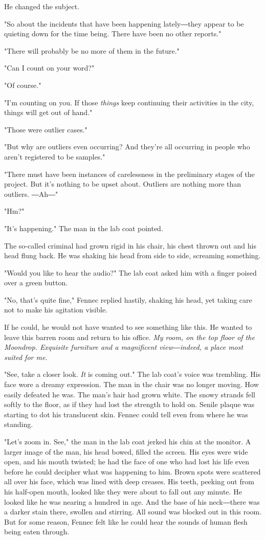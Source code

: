 He changed the subject.

"So about the incidents that have been happening lately―they appear to
be quieting down for the time being. There have been no other reports."

"There will probably be no more of them in the future."

"Can I count on your word?"

"Of course."

"I'm counting on you. If those \emph{things} keep continuing their activities
in the city, things will get out of hand."

"Those were outlier cases."

"But why are outliers even occurring? And they're all occurring in
people who aren't registered to be samples."

"There must have been instances of carelessness in the preliminary
stages of the project. But it's nothing to be upset about. Outliers are
nothing more than outliers. ―Ah―"

"Hm?"

"It's happening." The man in the lab coat pointed.

The so-called criminal had grown rigid in his chair, his chest thrown
out and his head flung back. He was shaking his head from side to side,
screaming something.

"Would you like to hear the audio?" The lab coat asked him with a finger
poised over a green button.

"No, that's quite fine," Fennec replied hastily, shaking his head, yet
taking care not to make his agitation visible.

If he could, he would not have wanted to see something like this. He
wanted to leave this barren room and return to his office. \emph{My room, on
the top floor of the Moondrop. Exquisite furniture and a magnificent
view―indeed, a place most suited for me.}

"See, take a closer look. \emph{It} is coming out." The lab coat's voice was
trembling. His face wore a dreamy expression. The man in the chair was
no longer moving. How easily defeated he was. The man's hair had grown
white. The snowy strands fell softly to the floor, as if they had lost
the strength to hold on. Senile plaque was starting to dot his
translucent skin. Fennec could tell even from where he was standing.

"Let's zoom in. See," the man in the lab coat jerked his chin at the
monitor. A larger image of the man, his head bowed, filled the screen.
His eyes were wide open, and his mouth twisted; he had the face of one
who had lost his life even before he could decipher what was happening
to him. Brown spots were scattered all over his face, which was lined
with deep creases. His teeth, peeking out from his half-open mouth,
looked like they were about to fall out any minute. He looked like he
was nearing a hundred in age. And the base of his neck―there was a
darker stain there, swollen and stirring. All sound was blocked out in
this room. But for some reason, Fennec felt like he could hear the
sounds of human flesh being eaten through.


